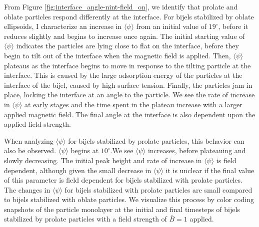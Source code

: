 From Figure \ref{fig:interface_angle-nint-field_on}, we identify that prolate and oblate particles respond differently at the interface. For
bijels stabilized by oblate ellipsoids, I characterize an increase in $\langle \psi \rangle$ from an initial value of $19 ^{\circ}$,
before it reduces slightly and begins to increase once again. The initial starting value of $\langle \psi \rangle$ indicates the
particles are lying close to flat on the interface, before they begin to tilt out of the interface when the magnetic field is applied. Then,
$\langle \psi \rangle$ plateaus as the interface begins to move in response to the tilting particle at the interface. This is caused by the
large adsorption energy of the particles at the interface of the bijel, caused by high surface tension. Finally, the particles jam in place,
locking the interface at an angle to the particle. We see the rate of increase in $\langle \psi \rangle$ at early stages and the time spent
in the plateau increase with a larger applied magnetic field. The final angle at the interface is also dependent upon the applied field
strength.

When analyzing $\langle \psi \rangle$ for bijels stabilized by prolate particles, this behavior can also be observed. $\langle \psi \rangle$
begins at $10 ^{\circ}$.We see $\langle \psi \rangle$ increases, before plateauing and slowly decreasing. The initial peak height and rate of increase in 
$\langle \psi \rangle$ is field dependent, although given the small decrease in $\langle \psi \rangle$ it is unclear if the final value of this parameter 
is field dependent for bijels stabilized with prolate particles. The changes in $\langle \psi \rangle$ for bijels stabilized with prolate particles are 
small compared to bijels stabilized with oblate particles. We visualize this process by color coding snapshots of the particle monolayer at the initial
and final timesteps of bijels stabilized by prolate particles with a field strength of $\bar{B} = 1$ applied.


